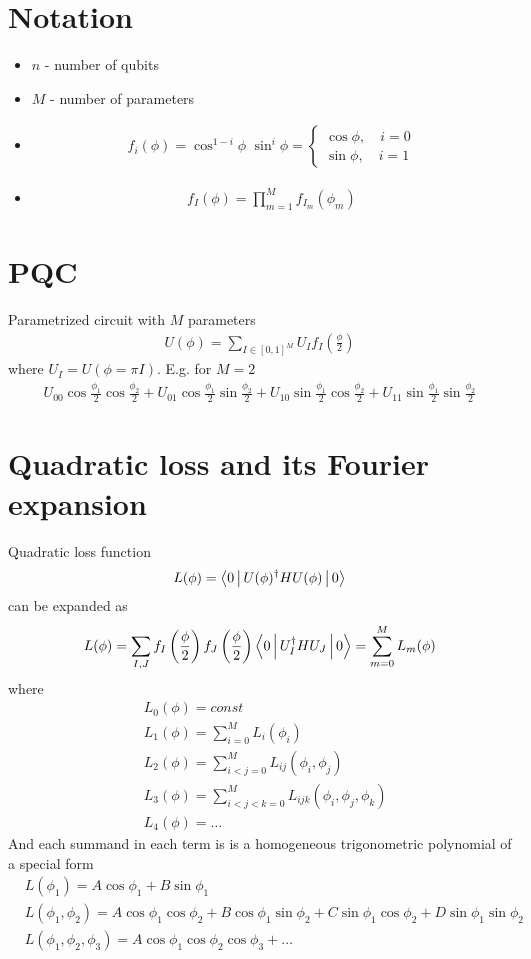 \documentclass[12 pt]{article}
\begin{document}
\tableofcontents
\section{Notation}
\begin{itemize}
\item $n$ - number of qubits
\item $M$ - number of parameters
\item
\begin{align}
	f_i(\phi)=\cos^{1-i}\phi\,\,\sin^i\phi=\begin{cases} \cos\phi,\quad i=0\\\sin\phi,\quad i=1\end{cases}
\end{align}
\item
\begin{align}
	f_I(\phi)=\prod_{m=1}^M f_{I_m}(\phi_m)
\end{align}
\end{itemize}
\section{PQC}
Parametrized circuit with $M$ parameters
\begin{align}
	U(\phi)=\sum_{I\in [0,1]^M}U_I f_I\left(\frac{\phi}{2}\right)
\end{align}
where $U_I = U(\phi=\pi I)$. E.g. for $M=2$
\begin{align}U_{00}\cos\frac{\phi_1}{2}\cos\frac{\phi_2}{2}+U_{01}\cos\frac{\phi_1}{2}\sin\frac{\phi_2}{2}+U_{10}\sin\frac{\phi_1}{2}\cos\frac{\phi_2}{2}+U_{11}\sin\frac{\phi_1}{2}\sin\frac{\phi_2}{2}
\end{align}
\section{Quadratic loss and its Fourier expansion}
Quadratic loss function
\begin{align}
	L(\phi)=\Braket{0|U(\phi)^\dagger H U(\phi)|0}
\end{align}
can be expanded as
\begin{align}
	L(\phi)=\sum_{I,J} f_I\left(\frac{\phi}{2}\right)f_J\left(\frac{\phi}{2}\right)\Braket{0|U_I^\dagger H U_J|0}=\sum_{m=0}^M L_m(\phi)
\end{align}
where
\begin{align}
&L_0(\phi) = const\\
&L_1(\phi)=\sum_{i=0}^M L_{i}(\phi_i)\\
&L_2(\phi)=\sum_{i<j=0}^M L_{ij}(\phi_i, \phi_j)\\
&L_3(\phi)=\sum_{i<j<k=0}^M L_{ijk}(\phi_i, \phi_j,\phi_k)\\
&L_4(\phi)=\dots
\end{align}
And each summand in each term is is a homogeneous trigonometric polynomial of a special form
\begin{align}
	&L(\phi_1)=A\cos\phi_1+B\sin\phi_1\\
	&L(\phi_1,\phi_2)=A\cos\phi_1\cos\phi_2+B\cos{\phi_1}\sin{\phi_2}+C\sin{\phi_1}\cos{\phi_2}+D\sin{\phi_1}\sin{\phi_2}\\
	&L(\phi_1,\phi_2,\phi_3)=A\cos{\phi_1}\cos{\phi_2}\cos{\phi_3}+\dots
\end{align}
\end{document}
